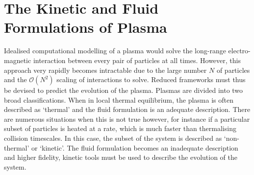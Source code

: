 \section{The Kinetic and Fluid Formulations of Plasma}%
\label{sec:theory_kin_fluid_plasmas}

Idealised computational modelling of a plasma would solve the long-range electro-magnetic interaction between every pair of particles at all times.
However, this approach very rapidly becomes intractable due to the large number $N$ of particles and the $\mathcal{O}(N^2)$ scaling of interactions to solve.
Reduced frameworks must thus be devised to predict the evolution of the plasma.
Plasmas are divided into two broad classifications.
When in local thermal equilibrium, the plasma is often described as `thermal' and the fluid formulation is an adequate description.
There are numerous situations when this is not true however, for instance if a particular subset of particles is heated at a rate, which is much faster than thermalising collision timescales.
In this case, the subset of the system is described as `non-thermal' or `kinetic'.
The fluid formulation becomes an inadequate description and higher fidelity, kinetic tools must be used to describe the evolution of the system.

